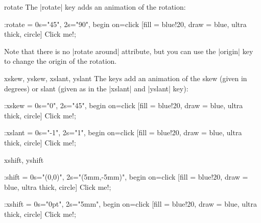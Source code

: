 \begin{tikzanimateattribute}{rotate}
  The |rotate| key adds an animation of the rotation:
\begin{codeexample}[animation list={0.5,1,1.5,2}]
\tikz \node :rotate = { 0s="45", 2s="90", begin on=click}
  [fill = blue!20, draw = blue, ultra thick, circle] {Click me!}; 
\end{codeexample}
  Note that there is no |rotate around| attribute, but you can use the
  |origin| key to change the origin of the rotation.
\end{tikzanimateattribute}


\begin{tikzanimateattribute}{xskew, yskew, xslant, yslant}
  The keys add an animation of the skew (given in degrees) or slant
  (given as in the |xslant| and |yslant| key):
\begin{codeexample}[animation list={0.5,1,1.5,2}]
\tikz \node :xskew = { 0s="0", 2s="45", begin on=click}
  [fill = blue!20, draw = blue, ultra thick, circle] {Click me!}; 
\end{codeexample}
\begin{codeexample}[animation list={0.5,1,1.5,2}]
\tikz \node :xslant = { 0s="-1", 2s="1", begin on=click}
  [fill = blue!20, draw = blue, ultra thick, circle] {Click me!}; 
\end{codeexample}
\end{tikzanimateattribute}

\begin{tikzanimateattribute}{xshift, yshift}
\begin{codeexample}[animation list={0.5,1,1.5,2}]
\tikz \node :shift = { 0s="{(0,0)}", 2s="{(5mm,-5mm)}",
                       begin on=click}
  [fill = blue!20, draw = blue, ultra thick, circle] {Click me!}; 
\end{codeexample}
\begin{codeexample}[animation list={0.5,1,1.5,2}]
\tikz \node :xshift = { 0s="0pt", 2s="5mm", begin on=click}
  [fill = blue!20, draw = blue, ultra thick, circle] {Click me!}; 
\end{codeexample}
\end{tikzanimateattribute}

